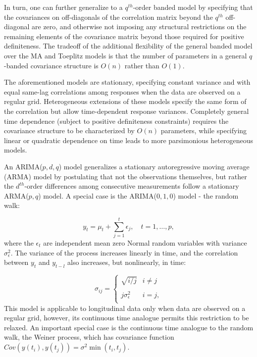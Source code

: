 \bigskip


In turn, one can further generalize to a $q^{th}$-order banded model by specifying that the covariances on off-diagonals of the correlation matrix beyond the $q^{th}$ off-diagonal are zero, and otherwise  not imposing any structural restrictions on the remaining elements of the covariance matrix beyond those required for positive definiteness. The tradeoff of the additional flexibility of the general banded model over the MA and Toeplitz models is that the number of parameters in a general $q$-banded covariance structure is $O\left(n\right)$ rather than $O\left(1\right)$.

\bigskip

The aforementioned models are stationary, specifying constant variance and with equal same-lag correlations among responses when the data are observed on a regular grid. Heterogeneous extensions of these models specify the same form of the correlation but allow time-dependent response variances. Completely general time dependence (subject to positive definiteness constraints) requires the covariance structure to be characterized by $O\left(n\right)$ parameters, while specifying linear or quadratic dependence on time leads to more parsimonious heterogeneous models. 

\bigskip

An ARIMA($p,d,q$) model generalizes a stationary autoregressive moving average (ARMA) model by postulating that not the observations themselves, but rather the $d^{th}$-order differences among consecutive measurements follow a stationary ARMA($p,q$) model. A special case is the ARIMA($0,1,0$) model - the random walk:

\begin{equation}
y_t = \mu_t + \sum_{j = 1}^t \epsilon_j, \quad t = 1, \dots, p,
\end{equation}
\noindent
where the $\epsilon_t$ are independent mean zero Normal random variables with variance $\sigma_\epsilon^2$. The variance of the process increases linearly in time, and the correlation between $y_t$ and $y_{t-l}$
 also increases, but nonlinearly, in time:
 
\begin{equation}
\sigma_{ij} = \left\{ \begin{array}{ll}
\sqrt{i/j} &i \ne j \\ 
& \\
j\sigma_\epsilon^2 & i= j, \\
\end{array}\right.
\end{equation}
\noindent
This model is applicable to longitudinal data only when data are observed on a regular grid, however, its continuous time analogue permits this restriction to be relaxed. An important special case is the continuous time analogue to the random walk, the Weiner process, which has covariance function $Cov\left(y\left(t_i\right), y\left(t_j\right)\right) = \sigma^2 \min\left(t_i, t_j\right)$.

